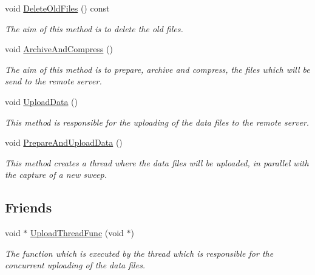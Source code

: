 \begin{DoxyCompactItemize}
\mbox{\label{classDataLogger_a4fd6e432dd4348cbe3b02a0fd6969ab5}} 
void \hyperlink{classDataLogger_a4fd6e432dd4348cbe3b02a0fd6969ab5}{Delete\+Old\+Files} () const
\begin{DoxyCompactList}\small\item\em The aim of this method is to delete the old files. \end{DoxyCompactList}\item 
void \hyperlink{classDataLogger_a147fb7eaee1c38bbf57ef2d6cddf70d5}{Archive\+And\+Compress} ()
\begin{DoxyCompactList}\small\item\em The aim of this method is to prepare, archive and compress, the files which will be send to the remote server. \end{DoxyCompactList}\item 
void \hyperlink{classDataLogger_ab58f4cc05f738ef757c884fe9ef131eb}{Upload\+Data} ()
\begin{DoxyCompactList}\small\item\em This method is responsible for the uploading of the data files to the remote server. \end{DoxyCompactList}\item 
void \hyperlink{classDataLogger_a98ea7aaa941bbddea8069415e1652759}{Prepare\+And\+Upload\+Data} ()
\begin{DoxyCompactList}\small\item\em This method creates a thread where the data files will be uploaded, in parallel with the capture of a new sweep. \end{DoxyCompactList}\end{DoxyCompactItemize}
\subsection*{Friends}
\begin{DoxyCompactItemize}
\item 
\mbox{\label{classDataLogger_a0cabdadaf836f897a111e72ab29d42f6}} 
void $\ast$ \hyperlink{classDataLogger_a0cabdadaf836f897a111e72ab29d42f6}{Upload\+Thread\+Func} (void $\ast$)
\begin{DoxyCompactList}\small\item\em The function which is executed by the thread which is responsible for the concurrent uploading of the data files. \end{DoxyCompactList}\end{DoxyCompactItemize}


